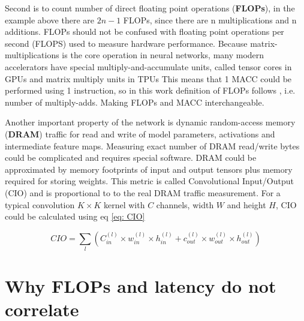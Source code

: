 Second is to count number of direct floating point operations (\textbf{FLOPs}), in the example above there are $2n - 1$ FLOPs, since there are n multiplications and n additions. FLOPs should not be confused with floating point operations per second (FLOPS) used to measure hardware performance. Because matrix-multiplications is the core operation in neural networks, many modern accelerators have special multiply-and-accumulate units, called tensor cores 
in GPUs and matrix multiply units in TPUs %
This means that 1 MACC could be performed using 1 instruction, so in this work definition of FLOPs follows \cite{zhang2018_shufflenet}, i.e. number of multiply-adds. Making FLOPs and MACC interchangeable.

Another important property of the network is dynamic random-access memory (\textbf{DRAM}) traffic for read and write of model parameters, activations and intermediate feature maps. Measuring exact number of DRAM read/write bytes could be complicated and requires special software. DRAM could be approximated by memory footprints of input and output tensors plus memory required for storing weights. This metric is called Convolutional Input/Output (CIO) \cite{chao2019_hardnet} and is proportional to to the real DRAM traffic measurement. For a typical convolution $K \times K$ kernel with $C$ channels, width $W$ and height $H$, CIO could be calculated using eq \ref{eq: CIO}

\begin{equation}
    C I O=\sum_{l}\left(C_{in}^{(l)} \times w_{in}^{(l)} \times h_{in}^{(l)}+c_{o u t}^{(l)} \times w_{o u t}^{(l)} \times h_{o u t}^{(l)}\right)
    \label{eq: CIO}
\end{equation}

\section{Why FLOPs and latency do not correlate}




